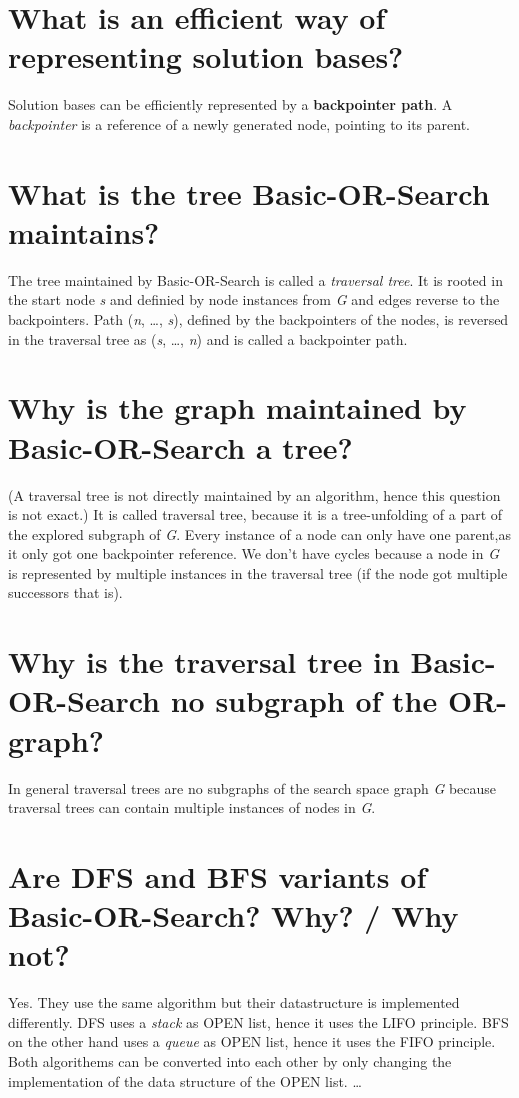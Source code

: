 \documentclass[12pt, a4paper]{article}
\begin{document}
\section{What is an efficient way of representing solution bases?}
Solution bases can be efficiently represented by a \textbf{backpointer path}. A \textit{backpointer} is a reference of a newly generated node, pointing to its parent.

\section{What is the tree Basic-OR-Search maintains?}
The tree maintained by Basic-OR-Search is called a \textit{traversal tree}. It is rooted in the start node \textit{s} and definied by node instances from \textit{G} and edges reverse to the backpointers. Path (\textit{n}, \ldots, \textit{s}), defined by the backpointers of the nodes, is reversed in the traversal tree as (\textit{s}, \ldots, \textit{n}) and is called a backpointer path.

\section{Why is the graph maintained by Basic-OR-Search a tree?}
(A traversal tree is not directly maintained by an algorithm, hence this question is not exact.) It is called traversal tree, because it is a tree-unfolding of a part of the explored subgraph of \textit{G}. Every instance of a node can only have one parent,as it only got one backpointer reference. We don't have cycles because a node in \textit{G} is represented by multiple instances in the traversal tree (if the node got multiple successors that is).

\section{Why is the traversal tree in Basic-OR-Search no subgraph of the OR-graph?}
In general traversal trees are no subgraphs of the  search space graph \textit{G} because traversal trees can contain multiple instances of nodes in \textit{G}.

\section{Are DFS and BFS variants of Basic-OR-Search? Why? / Why not?}
Yes. They use the same algorithm but their datastructure is implemented differently.
DFS uses a \textit{stack} as OPEN list, hence it uses the LIFO principle.
BFS on the other hand uses a \textit{queue} as OPEN list, hence it uses the FIFO principle.
Both algorithems can be converted into each other by only changing the implementation of the data structure of the OPEN list.
\ldots
\end{document}
